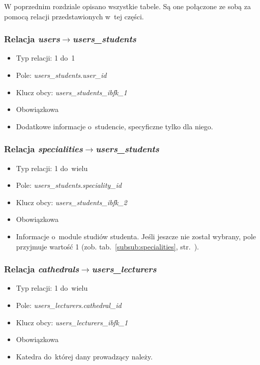 \documentclass[a4paper,12pt,oneside]{report}
\begin{document}
W poprzednim rozdziale opisano wszystkie tabele. Są one połączone ze sobą za pomocą relacji przedstawionych w~tej części.

\subsubsection{Relacja \emph{users}$\to$\emph{users\_students}}
\label{subsub:users-users_students}
\begin{itemize}
  \item Typ relacji: 1 do~1
  \item Pole: \emph{users\_students}.\emph{user\_id}
  \item Klucz obcy: \emph{users\_students\_ibfk\_1}
  \item Obowiązkowa
  \item Dodatkowe informacje o~studencie, specyficzne tylko dla niego.
\end{itemize}

\subsubsection{Relacja \emph{specialities}$\to$\emph{users\_students}}
\label{subsub:specialities-users_students}
\begin{itemize}
  \item Typ relacji: 1 do~wielu
  \item Pole: \emph{users\_students}.\emph{speciality\_id}
  \item Klucz obcy: \emph{users\_students\_ibfk\_2}
  \item Obowiązkowa
  \item Informacje o~module studiów studenta. Jeśli jeszcze nie został wybrany, pole przyjmuje wartość 1 (zob. tab.~\ref{subsub:specialities}, str.~\pageref{subsub:specialities}).
\end{itemize}

\subsubsection{Relacja \emph{cathedrals}$\to$\emph{users\_lecturers}}
\label{subsub:cathedrals-users_lecturers}
\begin{itemize}
  \item Typ relacji: 1 do~wielu
  \item Pole: \emph{users\_lecturers}.\emph{cathedral\_id}
  \item Klucz obcy: \emph{users\_lecturers\_ibfk\_1}
  \item Obowiązkowa
  \item Katedra do~której dany prowadzący należy.
\end{itemize}
\end{document}
